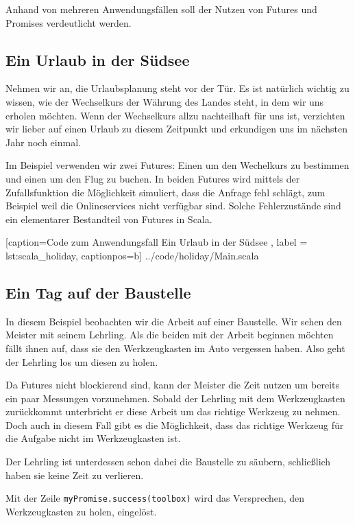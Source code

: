 \documentclass[11pt,a4paper,titlepage,ngerman]{scrartcl}
\begin{document}
Anhand von mehreren Anwendungsfällen soll der Nutzen von Futures und Promises
verdeutlicht werden. 

\subsection{Ein Urlaub in der Südsee}

Nehmen wir an, die Urlaubsplanung steht vor der Tür. Es ist natürlich wichtig
zu wissen, wie der Wechselkurs der Währung des Landes steht, in dem wir uns
erholen möchten. Wenn der Wechselkurs allzu nachteilhaft für uns ist,
verzichten wir lieber auf einen Urlaub zu diesem Zeitpunkt und erkundigen
uns im nächsten Jahr noch einmal.

Im Beispiel verwenden wir zwei Futures: Einen um den Wechelkurs zu bestimmen
und einen um den Flug zu buchen. In beiden Futures wird mittels der Zufallsfunktion
die Möglichkeit simuliert, dass die Anfrage fehl schlägt, zum Beispiel weil
die Onlineservices nicht verfügbar sind. Solche Fehlerzustände sind ein elementarer
Bestandteil von Futures in Scala.


    [caption={Code zum Anwendungsfall \glqq Ein Urlaub in der Südsee\grqq{} },
       label = lst:scala_holiday,
       captionpos=b]
 {../code/holiday/Main.scala}
 

\subsection{Ein Tag auf der Baustelle}

In diesem Beispiel beobachten wir die Arbeit auf einer Baustelle. Wir sehen
den Meister mit seinem Lehrling. Als die beiden mit der Arbeit beginnen möchten
fällt ihnen auf, dass sie den Werkzeugkasten im Auto vergessen haben. Also
geht der Lehrling los um diesen zu holen.

Da Futures nicht blockierend sind, kann der Meister die Zeit nutzen um bereits
ein paar Messungen vorzunehmen. Sobald der Lehrling mit dem Werkzeugkasten
zurückkommt unterbricht er diese Arbeit um das richtige Werkzeug zu nehmen.
Doch auch in diesem Fall gibt es die Möglichkeit, dass das richtige Werkzeug
für die Aufgabe nicht im Werkzeugkasten ist.

Der Lehrling ist unterdessen schon dabei die Baustelle zu säubern, schließlich
haben sie keine Zeit zu verlieren.

Mit der Zeile \texttt{myPromise.success(toolbox)} wird das Versprechen,
den Werkzeugkasten zu holen, eingelöst.
\end{document}
